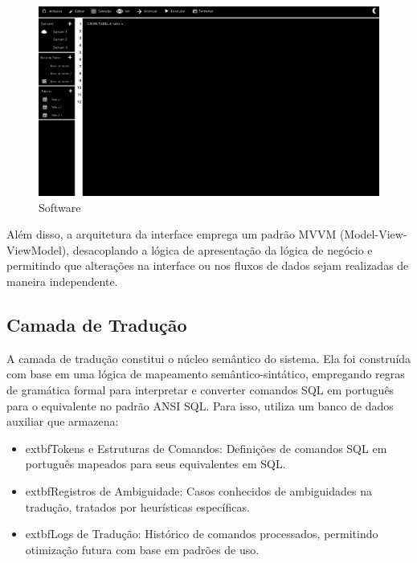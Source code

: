 \begin{figure}[H]
    \centering
    \includegraphics[width=1\textwidth]{figuras/UNBSQL.eps}
    \caption{Software}
    \label{fig:software_figma}
\end{figure}

Além disso, a arquitetura da interface emprega um padrão MVVM (Model-View-ViewModel), desacoplando a lógica de apresentação da lógica de negócio e permitindo que alterações na interface ou nos fluxos de dados sejam realizadas de maneira independente.

\subsection{Camada de Tradução}
A camada de tradução constitui o núcleo semântico do sistema. Ela foi construída com base em uma lógica de mapeamento semântico-sintático, empregando regras de gramática formal para interpretar e converter comandos SQL em português para o equivalente no padrão ANSI SQL. Para isso, utiliza um banco de dados auxiliar que armazena:

\begin{itemize}
    \item 	extbf{Tokens e Estruturas de Comandos}: Definições de comandos SQL em português mapeados para seus equivalentes em SQL.
    \item 	extbf{Registros de Ambiguidade}: Casos conhecidos de ambiguidades na tradução, tratados por heurísticas específicas.
    \item 	extbf{Logs de Tradução}: Histórico de comandos processados, permitindo otimização futura com base em padrões de uso.
\end{itemize}

